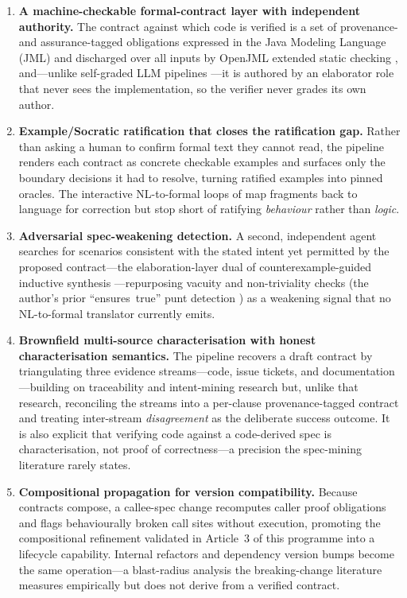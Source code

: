 \begin{enumerate}
  \item \textbf{A machine-checkable formal-contract layer with independent authority.} The contract against which code is verified is a set of provenance- and assurance-tagged obligations expressed in the Java Modeling Language (JML) and discharged over all inputs by OpenJML extended static checking \cite{leavens2006jml,cok2014openjml}, and---unlike self-graded LLM pipelines \cite{liu2026oracle}---it is authored by an elaborator role that never sees the implementation, so the verifier never grades its own author.
  \item \textbf{Example/Socratic ratification that closes the ratification gap.} Rather than asking a human to confirm formal text they cannot read, the pipeline renders each contract as concrete checkable examples and surfaces only the boundary decisions it had to resolve, turning ratified examples into pinned oracles. The interactive NL-to-formal loops of \cite{cosler2023nl2spec,endres2024nl2postcond} map fragments back to language for correction but stop short of ratifying \emph{behaviour} rather than \emph{logic}.
  \item \textbf{Adversarial spec-weakening detection.} A second, independent agent searches for scenarios consistent with the stated intent yet permitted by the proposed contract---the elaboration-layer dual of counterexample-guided inductive synthesis \cite{solarlezama2008sketching,alur2013sygus}---repurposing vacuity and non-triviality checks (the author's prior ``ensures~true'' punt detection \cite{edmonds_article3}) as a weakening signal that no NL-to-formal translator currently emits.
  \item \textbf{Brownfield multi-source characterisation with honest characterisation semantics.} The pipeline recovers a draft contract by triangulating three evidence streams---code, issue tickets, and documentation---building on traceability and intent-mining research \cite{antoniol2002recovering,merten2015issuetracking,tan2012tcomment} but, unlike that research, reconciling the streams into a per-clause provenance-tagged contract and treating inter-stream \emph{disagreement} as the deliberate success outcome. It is also explicit that verifying code against a code-derived spec is characterisation, not proof of correctness---a precision the spec-mining literature \cite{ernst2007daikon,ammons2002mining} rarely states.
  \item \textbf{Compositional propagation for version compatibility.} Because contracts compose, a callee-spec change recomputes caller proof obligations and flags behaviourally broken call sites without execution, promoting the compositional refinement validated in Article~3 of this programme \cite{edmonds_article3} into a lifecycle capability. Internal refactors and dependency version bumps become the same operation---a blast-radius analysis the breaking-change literature \cite{ochoa2022breaking,jayasuriya2024understanding,islam2025byam} measures empirically but does not derive from a verified contract.
\end{enumerate}

